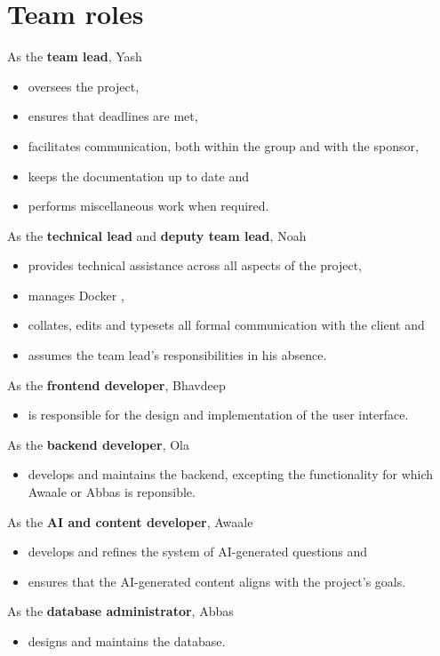 \documentclass{scrartcl}
\begin{document}
\section{Team roles}
As the \textbf{team lead}, Yash
\begin{itemize}
\item oversees the project,
\item ensures that deadlines are met,
\item facilitates communication, both within the group and with the sponsor,
\item keeps the documentation up to date and
\item performs miscellaneous work when required.
\end{itemize}

As the \textbf{technical lead} and \textbf{deputy team lead}, Noah
\begin{itemize}
\item provides technical assistance across all aspects of the project,
\item manages Docker \parencite{docker},
\item collates, edits and typesets all formal communication with the client and
\item assumes the team lead's responsibilities in his absence.
\end{itemize}

As the \textbf{frontend developer}, Bhavdeep
\begin{itemize}
\item is responsible for the design and implementation of the user interface.
\end{itemize}

As the \textbf{backend developer}, Ola
\begin{itemize}
\item develops and maintains the backend, excepting the functionality for which Awaale or Abbas is reponsible.
\end{itemize}

As the \textbf{AI and content developer}, Awaale
\begin{itemize}
\item develops and refines the system of AI-generated questions and
\item ensures that the AI-generated content aligns with the project's goals.
\end{itemize}

As the \textbf{database administrator}, Abbas
\begin{itemize}
\item designs and maintains the database.
\end{itemize}
\end{document}
